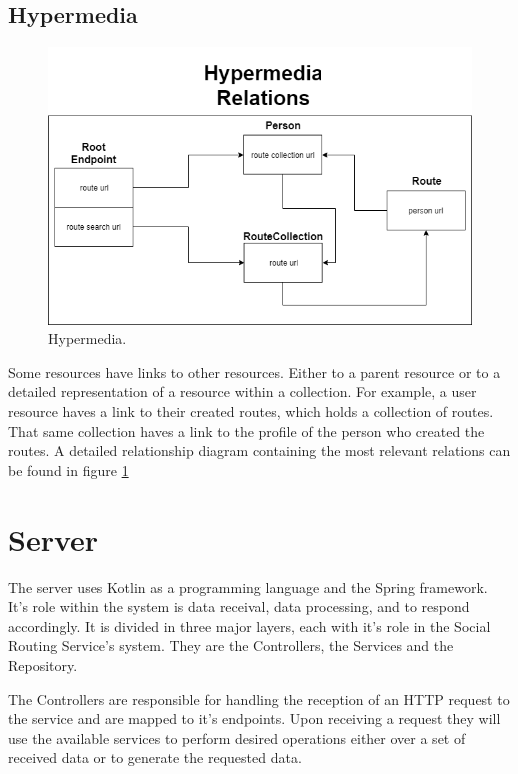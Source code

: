     \subsection{Hypermedia}
    
    \begin{figure}[H]            
        \includegraphics[width=\textwidth]{images/project-structure/hypermedia-relations.PNG}
        \caption{Hypermedia.}
        \label{fig:hypermedia-relations}
    \end{figure}   

    Some resources have links to other resources. Either to a parent resource or to a detailed representation of a 
    resource within a collection. For example, a user resource haves a link to their created routes, which 
    holds a collection of routes. That same collection haves a link to the profile of the person who created 
    the routes. A detailed relationship diagram containing the most relevant relations can be found in figure \ref{fig:hypermedia-relations} 
    
    \newpage

\section{Server} 
The server uses Kotlin as a programming language and the Spring framework\cite{springwebsite}. 
It's role within the system is data receival, data processing, 
and to respond accordingly. It is divided in three major layers, each with it's role in the Social Routing Service's system. 
They are the Controllers, the Services and the Repository.

The Controllers are responsible for handling the reception of an HTTP request to the service and are mapped to
it's endpoints. Upon receiving a request they will use the available services to perform desired operations either
over a set of received data or to generate the requested data.

